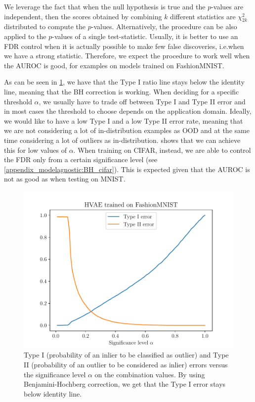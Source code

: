 {We leverage the fact that when the null hypothesis is true and the $p$-values are independent, then the scores obtained by combining $k$ different statistics are $\chi^2_{2k}$ distributed to compute the $p$-values. Alternatively, the procedure can be also applied to the $p$-values of a single test-statistic.
%
Usually, it is better to use an FDR control when it is actually possible to make few false discoveries, i.e.\@ when we have a strong statistic. Therefore, we expect the procedure to work well when the AUROC is good, for examples on models trained on FashionMNIST.

As can be seen in \cref{fig_modelagnostic:type1}, we have that the Type I ratio line stays below the identity line, meaning that the BH correction is working. When deciding for a specific threshold $\alpha$, we usually have to trade off between Type I and Type II error and in most cases the threshold to choose depends on the application domain. Ideally, we would like to have a low Type I and a low Type II error rate, meaning that we are not considering a lot of in-distribution examples as OOD and at the same time considering a lot of outliers as in-distribution.  shows that we can achieve this for low values of $\alpha$. When training on CIFAR, instead, we are able to control the FDR only from a certain significance level (see \cref{appendix_modelagnostic:BH_cifar}). This is expected given that the AUROC is not as good as when testing on MNIST.


\begin{figure}[tb]
    \centering
    \includegraphics[scale=0.6]{graphics/paper_modelagnostic/fashion_hvae_type1_correct_font.pdf}
    \caption[Type I and Type II errors versus the significance level $\alpha$ on the combination values.]{ Type I (probability of an inlier to be classified as outlier) and Type II (probability of an outlier to be considered as inlier) errors versus the significance level $\alpha$ on the combination values. By using Benjamini-Hochberg correction, we get that the Type I error stays below identity line.}
    \label{fig_modelagnostic:type1}
\end{figure}


}
